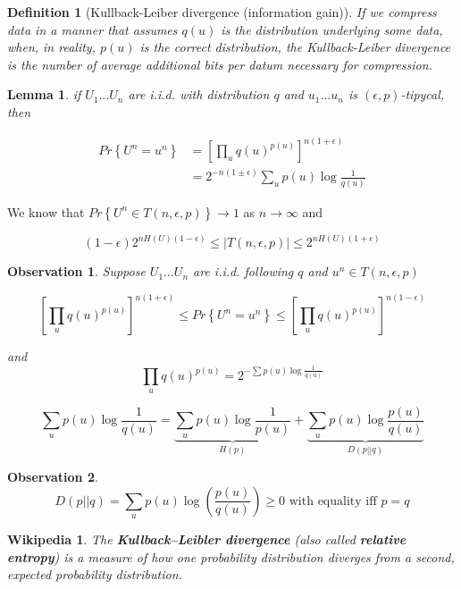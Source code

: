 \documentclass{article}
\newtheorem{observation}{Observation}[section]
\newtheorem*{wikipedia}{Wikipedia}
\newtheorem{lemma}[theorem]{Lemma}
\newtheorem{definition}{Definition}[section]
\theoremstyle{definition} %
\renewcommand{\Pr}[1]{Pr\left\{#1\right\}}
\newcommand{\pfrac}[2]{\left( \frac{#1}{#2} \right)}
\begin{document}
\begin{definition}[Kullback-Leiber divergence (information gain)]
  If we compress data in a manner that assumes $q(u)$ is the distribution underlying some data, when, in reality, $p(u)$ is the correct distribution, the Kullback-Leiber divergence is the number of average additional bits per datum necessary for compression.
\end{definition}


\begin{lemma}
  if $U_1 \dots U_n$ are i.i.d. with distribution $q$ and $u_1 \dots u_n$ is $(\epsilon, p)$-tipycal, then

  \begin{align*}
    \Pr{U^n = u^n}
    &= \left[ \prod_u q(u)^{p(u)}\right]^{n (1 + \epsilon)} \\
    &= 2^{-n(1\pm \epsilon)} \sum_u p(u) \log \frac 1 {q(u)}
  \end{align*}
\end{lemma}

We know that $\Pr{U^n \in T(n, \epsilon, p)} \to 1$ as $n\to \infty$ and

\[
  (1-\epsilon)2^{nH(U)(1-\epsilon)} \leq | T(n, \epsilon, p) | \leq 2^{nH(U)(1+\epsilon)}
\]

\begin{observation}

Suppose $U_1 \dots U_n$ are i.i.d. following $q$ and $u^n \in T(n, \epsilon, p)$

\[
  \left[ \prod_u q(u)^{p(u)} \right]^{n(1+\epsilon)} \leq \Pr{U^n = u^n} \leq  \left[ \prod_u q(u)^{p(u)} \right]^{n(1-\epsilon)}
\]

and
\[
  \prod_u q(u)^{p(u)} = 2^{-\sum p(u) \log \frac 1 {q(u)}}
\]

\[
  \sum_u p(u) \log \frac 1 {q(u)} =
  \underbrace{\sum_u p(u) \log \frac 1 {p(u)}}_{H(p)} +
  \underbrace{\sum_u p(u) \log \frac {p(u)} {q(u)}}_{D(p||q)}
\]
\end{observation}

\begin{observation}
  \[
    D(p||q) = \sum_u p(u) \log \pfrac {p(u)} {q(u)} \geq 0 \text{ with equality iff } p = q
  \]
\end{observation}

\begin{wikipedia}
The \textbf{Kullback–Leibler divergence} (also called \textbf{relative entropy}) is a measure of how one probability distribution diverges from a second, expected probability distribution.
\end{wikipedia}
\end{document}
